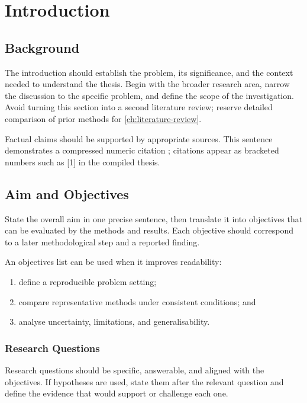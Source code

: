\chapter{Introduction}
\label{ch:introduction}

\section{Background}

The introduction should establish the problem, its significance, and the context
needed to understand the thesis. Begin with the broader research area, narrow the
discussion to the specific problem, and define the scope of the investigation.
Avoid turning this section into a second literature review; reserve detailed
comparison of prior methods for \cref{ch:literature-review}.

Factual claims should be supported by appropriate sources. This sentence
demonstrates a compressed numeric citation \parencite{example2025,example2024};
citations appear as bracketed numbers such as [1] in the compiled thesis.

\section{Aim and Objectives}

State the overall aim in one precise sentence, then translate it into objectives
that can be evaluated by the methods and results. Each objective should correspond
to a later methodological step and a reported finding.

An objectives list can be used when it improves readability:

\begin{enumerate}[label=\textbf{O\arabic*:},leftmargin=*]
  \item define a reproducible problem setting;
  \item compare representative methods under consistent conditions; and
  \item analyse uncertainty, limitations, and generalisability.
\end{enumerate}

\subsection{Research Questions}

Research questions should be specific, answerable, and aligned with the objectives.
If hypotheses are used, state them after the relevant question and define the
evidence that would support or challenge each one.

